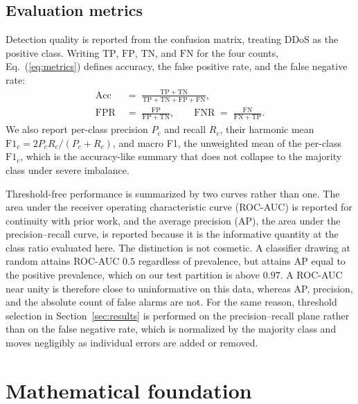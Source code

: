 \documentclass{ieeeaccess}
\begin{document}
\subsection{Evaluation metrics}
Detection quality is reported from the confusion matrix, treating DDoS as the positive class. Writing $\mathrm{TP}$, $\mathrm{FP}$, $\mathrm{TN}$, and $\mathrm{FN}$ for the four counts, Eq.~(\ref{eq:metrics}) defines accuracy, the false positive rate, and the false negative rate:
\begin{equation}
\begin{aligned}
\mathrm{Acc} \;&=\; \frac{\mathrm{TP}+\mathrm{TN}}
                         {\mathrm{TP}+\mathrm{TN}+\mathrm{FP}+\mathrm{FN}}, \\[6pt]
\mathrm{FPR} \;&=\; \frac{\mathrm{FP}}{\mathrm{FP}+\mathrm{TN}}, \qquad
\mathrm{FNR} \;=\; \frac{\mathrm{FN}}{\mathrm{FN}+\mathrm{TP}}.
\end{aligned}
\label{eq:metrics}
\end{equation}
We also report per-class precision $P_c$ and recall $R_c$, their harmonic mean $\mathrm{F1}_c = 2P_cR_c/(P_c+R_c)$, and macro F1, the unweighted mean of the per-class $\mathrm{F1}_c$, which is the accuracy-like summary that does not collapse to the majority class under severe imbalance.

Threshold-free performance is summarized by two curves rather than one. The area under the receiver operating characteristic curve (ROC-AUC) is reported for continuity with prior work, and the average precision (AP), the area under the precision--recall curve, is reported because it is the informative quantity at the class ratio evaluated here. The distinction is not cosmetic. A classifier drawing at random attains ROC-AUC $0.5$ regardless of prevalence, but attains AP equal to the positive prevalence, which on our test partition is above $0.97$. A ROC-AUC near unity is therefore close to uninformative on this data, whereas AP, precision, and the absolute count of false alarms are not. For the same reason, threshold selection in Section~\ref{sec:results} is performed on the precision--recall plane rather than on the false negative rate, which is normalized by the majority class and moves negligibly as individual errors are added or removed.

\section{Mathematical foundation}
\label{sec:math}
\end{document}
